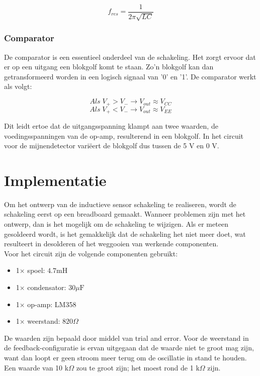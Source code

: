 \documentclass{report}
\begin{document}
\begin{equation}
f_{res}=\frac{1}{2\pi\sqrt{LC}}
\end{equation}

\subsubsection{Comparator}
De comparator is een essentieel onderdeel van de schakeling. Het zorgt ervoor dat er op een uitgang een blokgolf komt te staan. Zo'n blokgolf kan dan getransformeerd worden in een logisch signaal van '0' en '1'. De comparator werkt als volgt:

\begin{equation}
Als \;V_+ > V_- \rightarrow V_{out}\approx V_{CC}
\end{equation}
\begin{equation}
Als \; V_+ < V_- \rightarrow V_{out}\approx V_{EE}
\end{equation}

\noindent
Dit leidt ertoe dat de uitgangsspanning klampt aan twee waarden, de voedingsspanningen van de op-amp, resulterend in een blokgolf. In het circuit voor de mijnendetector variëert de blokgolf dus tussen de 5 V en 0 V.\\

\section{Implementatie}
Om het ontwerp van de inductieve sensor schakeling te realiseren, wordt de schakeling eerst op een breadboard gemaakt. Wanneer problemen zijn met het ontwerp, dan is het mogelijk om de schakeling te wijzigen. Als er meteen gesoldeerd wordt, is het gemakkelijk dat de schakeling het niet meer doet, wat resulteert in desolderen of het weggooien van werkende componenten.\\ 

\noindent Voor het circuit zijn de volgende componenten gebruikt:
\begin{itemize}
\item 1$\times$ spoel: $4.7 \mathrm{mH}$
\item 1$\times$ condensator: $30 \mu \mathrm{F}$
\item 1$\times$ op-amp: LM358
\item 1$\times$ weerstand: $820 \Omega$
\end{itemize}

\noindent
De waarden zijn bepaald door middel van trial and error. Voor de weerstand in de feedback-configuratie is ervan uitgegaan dat de waarde niet te groot mag zijn, want dan loopt er geen stroom meer terug om de oscillatie in stand te houden. Een waarde van 10 k$\Omega$ zou te groot zijn; het moest rond de 1 k$\Omega$ zijn.
\end{document}

